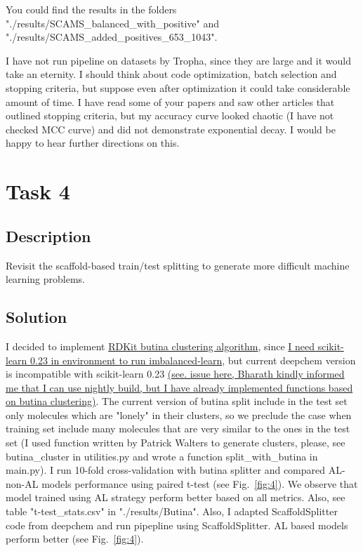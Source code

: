 \documentclass[a4paper,10pt]{article}
\begin{document}
You could find the results in the folders "./results/SCAMS\_balanced\_with\_positive" and "./results/SCAMS\_added\_positives\_653\_1043".

I have not run pipeline on datasets by Tropha, since they are large and it would take an eternity. I should think about code optimization, batch selection and stopping criteria, but suppose even after optimization it could take considerable amount of time. I have read some of your papers \cite{reker2017active, rakers2017small} and saw other articles\cite{zhu2010confidence, ertekin2007learning} that outlined stopping criteria, but my accuracy curve looked chaotic (I have not checked MCC curve) and did not demonstrate exponential decay. I would be happy to hear further directions on this. 


\section{Task 4}


\subsection{Description}
Revisit the scaffold-based train/test splitting to generate more difficult machine learning problems.
\subsection{Solution}
I decided to implement \href{https://www.rdkit.org/docs/source/rdkit.ML.Cluster.Butina.html}{RDKit butina clustering algorithm}\cite{butina1999unsupervised}, since \href{https://imbalanced-learn.org/stable/install.html}{I need scikit-learn 0.23 in environment to run imbalanced-learn}, but current deepchem version is incompatible with scikit-learn 0.23 \href{https://github.com/deepchem/deepchem/issues/1861}{(see. issue here, Bharath kindly informed me that I can use nightly build, but I have already implemented functions based on butina clustering)}. The current version of butina split include in the test set only molecules which are "lonely" in their clusters, so we preclude the case when training set include many molecules that are very similar to the ones in the test set (I used function written by Patrick Walters to generate clusters, please, see butina\_cluster in utilities.py and wrote a function split\_with\_butina in main.py). I run 10-fold cross-validation with butina splitter and compared AL- non-AL models performance using paired t-test (see Fig.~\ref{fig:4}). We observe that model trained using AL strategy perform better based on all metrics. Also, see table "t-test\_stats.csv" in "./results/Butina".
Also, I adapted ScaffoldSplitter code from deepchem and run pipepline using ScaffoldSplitter. AL based models perform better (see Fig.~\ref{fig:4}).
\end{document}
